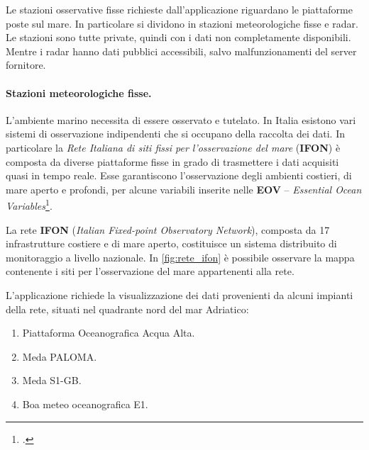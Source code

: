 \documentclass[./main.tex]{subfiles}
\begin{document}
Le stazioni osservative fisse richieste dall'applicazione riguardano le piattaforme poste sul mare. In particolare si dividono in stazioni meteorologiche fisse e radar. Le stazioni sono tutte private, quindi con i dati non completamente disponibili. Mentre i radar hanno dati pubblici accessibili, salvo malfunzionamenti del server fornitore.

\paragraph{Stazioni meteorologiche fisse.}

L'ambiente marino necessita di essere osservato e tutelato. In Italia esistono vari sistemi di osservazione indipendenti che si occupano della raccolta dei dati. In particolare la \textit{Rete Italiana di siti fissi per l’osservazione del mare} (\textbf{IFON}) è composta da diverse piattaforme fisse in grado di trasmettere i dati acquisiti quasi in tempo reale. Esse garantiscono l'osservazione degli ambienti costieri, di mare aperto e profondi, per alcune variabili inserite nelle \textbf{EOV} -- \textit{Essential Ocean Variables}\footcite[5]{rete-ifon}.\par


La rete \textbf{IFON} (\textit{Italian Fixed-point Observatory Network}), composta da 17 infrastrutture costiere e di mare aperto, costituisce un sistema distribuito di monitoraggio a livello nazionale. In \autoref{fig:rete_ifon} è possibile osservare la mappa contenente i siti per l'osservazione del mare appartenenti alla rete.\par

L'applicazione richiede la visualizzazione dei dati provenienti da alcuni impianti della rete, situati nel quadrante nord del mar Adriatico:

\begin{enumerate}
    \item Piattaforma Oceanografica Acqua Alta.
    \item Meda PALOMA.
    \item Meda S1-GB.
    \item Boa meteo oceanografica E1.\par
\end{enumerate}
\end{document}
